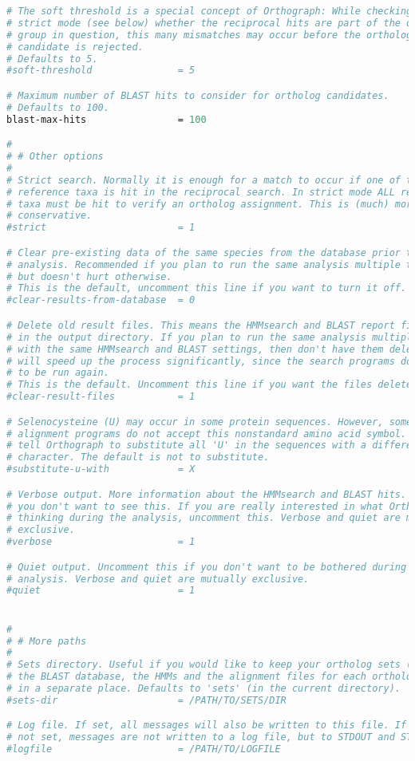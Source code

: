 \begin{lstlisting}[language=perl]
# The soft threshold is a special concept of Orthograph: While checking in
# strict mode (see below) whether the reciprocal hits are part of the ortholog
# group in question, this many mismatches may occur before the ortholog
# candidate is rejected.
# Defaults to 5.
#soft-threshold               = 5

# Maximum number of BLAST hits to consider for ortholog candidates.
# Defaults to 100.
blast-max-hits                = 100

# 
# # Other options
#
# Strict search. Normally it is enough for a match to occur if one of the
# reference taxa is hit in the reciprocal search. In strict mode ALL reference
# taxa must be hit to verify an ortholog assignment. This is (much) more
# conservative.
#strict                       = 1

# Clear pre-existing data of the same species from the database prior to the
# analysis. Recommended if you plan to run the same analysis multiple times,
# but doesn't hurt otherwise. 
# This is the default, uncomment this line if you want to turn it off.
#clear-results-from-database  = 0

# Delete old result files. This means the HMMsearch and BLAST report files found
# in the output directory. If you plan to run the same analysis multiple times
# with the same HMMsearch and BLAST settings, then don't have them deleted. This
# will speed up the process significantly, since the search programs don't have
# to be run again.
# This is the default. Uncomment this line if you want the files deleted.
#clear-result-files           = 1

# Selenocysteine (U) may occur in some protein sequences. However, some
# alignment programs do not accept this nonstandard amino acid symbol. You can
# tell Orthograph to substitute all 'U' in the sequences with a different
# character. The default is not to substitute.
#substitute-u-with            = X

# Verbose output. More information about the HMMsearch and BLAST hits. Normally
# you don't want to see this. If you are really interested in what Orthograph is
# thinking during the analysis, uncomment this. Verbose and quiet are mutually
# exclusive.
#verbose                      = 1

# Quiet output. Uncomment this if you don't want to be bothered during the
# analysis. Verbose and quiet are mutually exclusive.
#quiet                        = 1


#
# # More paths
# 
# Sets directory. Useful if you would like to keep your ortholog sets (that is,
# the BLAST database, the HMMs and the alignment files for each ortholog gene)
# in a separate place. Defaults to 'sets' (in the current directory).
#sets-dir                     = /PATH/TO/SETS/DIR

# Log file. If set, all messages will also be written to this file. If this is
# not set, messages are not written to a log file, but to STDOUT and STDERR.
#logfile                      = /PATH/TO/LOGFILE
\end{lstlisting}
